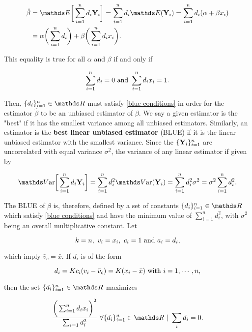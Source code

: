 \documentclass{homework}
\begin{document}
\begin{align*}
    \hat{\beta} &= \E \bigg[\sum_{i=1}^{n} d_i {\bf Y}_i\bigg]  = \sum_{i=1}^{n} d_i \E({\bf Y}_i) = \sum_{i=1}^{n} d_i (\alpha + \beta x_i) \\
    &= \alpha \bigg(\sum_{i=1}^{n} d_i\bigg) + \beta \bigg(\sum_{i=1}^{n} d_i x_i\bigg).
\end{align*}

This equality is true for all $\alpha$ and $\beta$ if and only if 

\begin{align}
    \sum_{i=1}^{n} d_i = 0 \textnormal{ and } \sum_{i=1}^{n} d_i x_i = 1.
    \label{blue conditions}
\end{align}

Then, $\{d_i\}_{i=1}^{n} \in \R$ must satisfy \eqref{blue conditions} in order for the estimator $\hat{\beta}$ to be an unbiased estimator of $\beta$. We say a given estimator is the "best" if it has the smallest variance among all unbiased estimators. Similarly, an estimator is the \textbf{best linear unbiased estimator} (BLUE) if it is the linear unbiased estimator with the smallest variance. Since the  $\{{\bf Y}_i\}_{i=1}^{n}$ are uncorrelated with equal variance $\sigma^2$, the variance of any linear estimator if given by 

\begin{align*}
    \var \bigg[\sum_{i=1}^{n} d_i {\bf Y}_i\bigg]  = \sum_{i=1}^{n} d_i^2 \var({\bf Y}_i) = \sum_{i=1}^{n} d_i^2 \sigma^2 = \sigma^2 \sum_{i=1}^{n} d_i^2. 
\end{align*}

The BLUE of $\beta$ is, therefore, defined by a set of constants  $\{d_i\}_{i=1}^{n} \in \R$ which satisfy \eqref{blue conditions} and have the minimum value of $\sum_{i=1}^{n} d_i^2$, with $\sigma^2$ being an overall multiplicative constant. Let 

$$
k = n, \textnormal{ } v_i = x_i, \textnormal{ } c_i = 1 \textnormal{ and } a_i = d_i,
$$

which imply $\bar{v}_c = \bar{x}$. If $d_i$ is of the form 

\begin{equation}
    d_i = Kc_i ( v_i - \bar{v}_c) = K (x_i - \bar{x}) \textnormal{ with } i = 1, \cdots, n,
    \label{gram schmidt}
\end{equation}


then the set $\{d_i\}_{i=1}^{n} \in \R$ maximizes 

\begin{equation}
    \frac{\bigg(\sum_{i=1}^{n} d_i x_i\bigg)^2}{\sum_{i=1} d_i^2} \blank \forall \{d_i\}_{i=1}^{n} \in \R \blank | \blank \sum_{i} d_i = 0.
    \label{maximize functional}
\end{equation}
\end{document}
